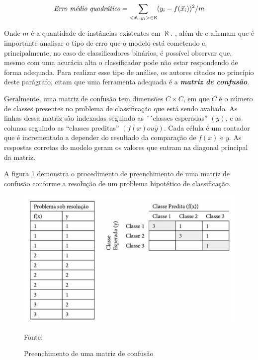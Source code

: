 \begin{equation}\label{erro_quadratico_medio}
\text{\textit{Erro médio quadrático}}=\sum_{<\vec{x}_i, y_i> \in \aleph} (y_i - f(\vec{x}_i))^2/m
\end{equation}

Onde $m$ é a quantidade de instâncias existentes em $\aleph$. \cite{Boscarioli2017}, \cite{amaral_introducao_2018} além de \cite{deng_improved_2016} e \cite{ruuska_evaluation_2018} afirmam que é importante analisar o tipo de erro que o modelo está cometendo e, principalmente, no caso de classificadores binários, é possível observar que, mesmo com uma acurácia alta o classificador pode não estar respondendo de forma adequada. Para realizar esse tipo de análise, os autores citados no princípio deste parágrafo, citam que uma ferramenta adequada é a \textit{\textbf{matriz de confusão}}. 

Geralmente, uma matriz de confusão tem dimensões $C \times C$, em que $C$ é o número de classes presentes no problema de classificação que está sendo avaliado. As linhas dessa matriz são indexadas seguindo as ´´classes esperadas'' $(y)$, e as colunas seguindo as ``classes preditas'' $(f(x) ou \hat{y})$. Cada célula é um contador que é incrementado a depender do resultado da comparação de $f(x)$ e $y$. As respostas corretas do modelo geram os valores que entram na diagonal principal da matriz. \cite[p. 130]{Boscarioli2017}

A figura \ref{fig:matriz_confusao} demonstra o procedimento de preenchimento de uma matriz de confusão conforme a resolução de um problema hipotético de classificação.

\begin{figure}[h!]
	\centering
	\includegraphics[width=.8\textwidth]{imagens/confusion_matrix.png}
	\caption{Preenchimento de uma matriz de confusão}
	{\scriptsize Fonte: \cite[p. 130]{Boscarioli2017}}
	\label{fig:matriz_confusao}
\end{figure}

